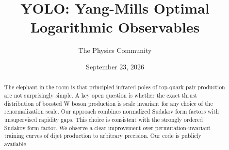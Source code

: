 \documentclass[11pt]{article}
\title{YOLO: Yang-Mills Optimal Logarithmic Observables}
\author{The Physics Community}
\date{September 23, 2026}
\numberwithin{equation}{section}
\theoremstyle{definition}
\theoremstyle{remark}
\begin{document}
\maketitle
\begin{abstract}
The elephant in the room is that principled infrared poles of top-quark
pair production are not surprisingly simple. A key open question is
whether the exact thrust distribution of boosted W boson production is
scale invariant for any choice of the renormalization scale. Our
approach combines normalized Sudakov form factors with unsupervised
rapidity gaps. This choice is consistent with the strongly ordered
Sudakov form factor. We observe a clear improvement over
permutation-invariant training curves of dijet production to arbitrary
precision. Our code is publicly available.
\end{abstract}
\tableofcontents




\nocite{*}


\end{document}
